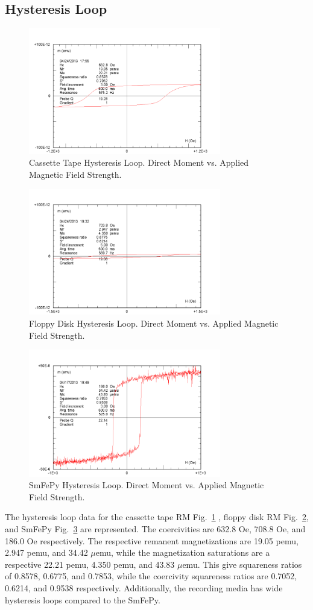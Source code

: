 \documentclass[aps,twocolumn,groupedaddress]{revtex4}
\begin{document}
\subsection{Hysteresis Loop}
\begin{figure}[h]
\includegraphics[width=3.3in]{cassettehyst}
\caption{Cassette Tape Hysteresis Loop. Direct Moment vs. Applied Magnetic Field Strength.}
\label{ch}
\end{figure}
\begin{figure}[h]
\includegraphics[width=3.3in]{floppyhyst}
\caption{Floppy Disk Hysteresis Loop. Direct Moment vs. Applied Magnetic Field Strength.}
\label{fh}
\end{figure}
\begin{figure}[h]
\includegraphics[width=3.3in]{smfepyhyst}
\caption{SmFePy Hysteresis Loop. Direct Moment vs. Applied Magnetic Field Strength.}
\label{sh}
\end{figure}
The hysteresis loop data for the cassette tape RM Fig.\ \ref{ch} , floppy disk RM Fig.\ \ref{fh}, and SmFePy Fig.\ \ref{sh} are represented. The coercivities are 632.8 Oe, 708.8 Oe, and 186.0 Oe respectively. The respective remanent magnetizations are 19.05 pemu, 2.947 pemu, and 34.42 $\mu$emu, while the magnetization saturations are a respective 22.21 pemu, 4.350 pemu, and 43.83 $\mu$emu. This give squareness ratios of 0.8578, 0.6775, and 0.7853, while the coercivity squareness ratios are 0.7052, 0.6214, and 0.9538 respectively. Additionally, the recording media has wide hysteresis loops compared to the SmFePy.
\end{document}

